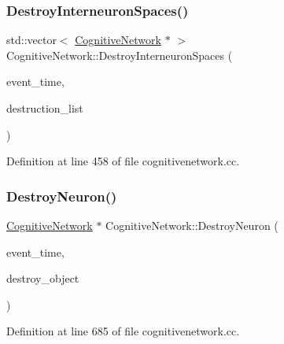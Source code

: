 \subsubsection{\texorpdfstring{Destroy\+Interneuron\+Spaces()}{DestroyInterneuronSpaces()}}
{\footnotesize\ttfamily std\+::vector$<$ \mbox{\hyperlink{class_cognitive_network}{Cognitive\+Network}} $\ast$ $>$ Cognitive\+Network\+::\+Destroy\+Interneuron\+Spaces (\begin{DoxyParamCaption}\item[{std\+::chrono\+::time\+\_\+point$<$ \mbox{\hyperlink{universe_8h_a0ef8d951d1ca5ab3cfaf7ab4c7a6fd80}{Clock}} $>$}]{event\+\_\+time,  }\item[{std\+::vector$<$ \mbox{\hyperlink{class_cognitive_network}{Cognitive\+Network}} $\ast$$>$}]{destruction\+\_\+list }\end{DoxyParamCaption})}



Definition at line 458 of file cognitivenetwork.\+cc.

\mbox{\label{class_cognitive_network_ab3318f517da206ad4286b6cc22acf520}} 
\subsubsection{\texorpdfstring{Destroy\+Neuron()}{DestroyNeuron()}}
{\footnotesize\ttfamily \mbox{\hyperlink{class_cognitive_network}{Cognitive\+Network}} $\ast$ Cognitive\+Network\+::\+Destroy\+Neuron (\begin{DoxyParamCaption}\item[{std\+::chrono\+::time\+\_\+point$<$ \mbox{\hyperlink{universe_8h_a0ef8d951d1ca5ab3cfaf7ab4c7a6fd80}{Clock}} $>$}]{event\+\_\+time,  }\item[{\mbox{\hyperlink{class_cognitive_network}{Cognitive\+Network}} $\ast$}]{destroy\+\_\+object }\end{DoxyParamCaption})}



Definition at line 685 of file cognitivenetwork.\+cc.

\mbox{\label{class_cognitive_network_af2f706043a0c227b93877e29b056f3c9}} 
